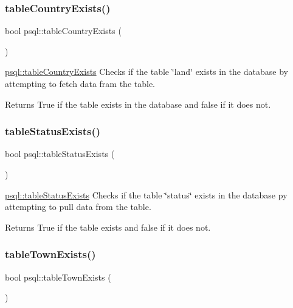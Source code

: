 \subsubsection{\texorpdfstring{table\+Country\+Exists()}{tableCountryExists()}}
{\footnotesize\ttfamily bool psql\+::table\+Country\+Exists (\begin{DoxyParamCaption}{ }\end{DoxyParamCaption})}



\hyperlink{classpsql_ae0ab0012c58471bd3fd63c286fb22224}{psql\+::table\+Country\+Exists} Checks if the table \char`\"{}land\char`\"{} exists in the database by attempting to fetch data fram the table. 

\begin{DoxyReturn}{Returns}
True if the table exists in the database and false if it does not. 
\end{DoxyReturn}
\mbox{\label{classpsql_a3f8bac89bd0cee3af77e47e5c555543d}} 
\subsubsection{\texorpdfstring{table\+Status\+Exists()}{tableStatusExists()}}
{\footnotesize\ttfamily bool psql\+::table\+Status\+Exists (\begin{DoxyParamCaption}{ }\end{DoxyParamCaption})}



\hyperlink{classpsql_a3f8bac89bd0cee3af77e47e5c555543d}{psql\+::table\+Status\+Exists} Checks if the table \char`\"{}status\char`\"{} exists in the database py attempting to pull data from the table. 

\begin{DoxyReturn}{Returns}
True if the table exists and false if it does not. 
\end{DoxyReturn}
\mbox{\label{classpsql_a717162b7d7faa0fb41b5a526e42de4ac}} 
\subsubsection{\texorpdfstring{table\+Town\+Exists()}{tableTownExists()}}
{\footnotesize\ttfamily bool psql\+::table\+Town\+Exists (\begin{DoxyParamCaption}{ }\end{DoxyParamCaption})}



